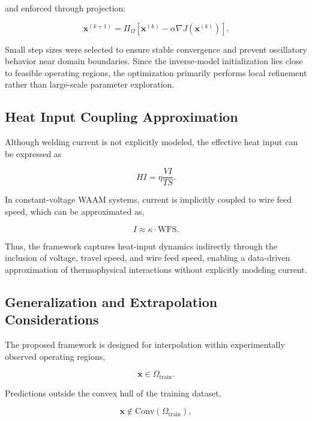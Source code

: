 \documentclass[11pt]{article}
\begin{document}
and enforced through projection:

\begin{equation}
\mathbf{x}^{(k+1)} =
\Pi_{\Omega}
\left[
\mathbf{x}^{(k)} - \alpha \nabla J(\mathbf{x}^{(k)})
\right].
\end{equation}

Small step sizes were selected to ensure stable convergence and prevent oscillatory behavior near domain boundaries. Since the inverse-model initialization lies close to feasible operating regions, the optimization primarily performs local refinement rather than large-scale parameter exploration.

\subsection{Heat Input Coupling Approximation}

Although welding current is not explicitly modeled, the effective heat input can be expressed as

\begin{equation}
HI = \eta \frac{VI}{TS}.
\end{equation}

In constant-voltage WAAM systems, current is implicitly coupled to wire feed speed, which can be approximated as,

\begin{equation}
I \approx \kappa \cdot \mathrm{WFS}.
\end{equation}

Thus, the framework captures heat-input dynamics indirectly through the inclusion of voltage, travel speed, and wire feed speed, enabling a data-driven approximation of thermophysical interactions without explicitly modeling current.

\subsection{Generalization and Extrapolation Considerations}

The proposed framework is designed for interpolation within experimentally observed operating regions,

\begin{equation}
\mathbf{x} \in \Omega_{\mathrm{train}}.
\end{equation}

Predictions outside the convex hull of the training dataset,

\begin{equation}
\mathbf{x} \notin \mathrm{Conv}(\Omega_{\mathrm{train}}),
\end{equation}
\end{document}
